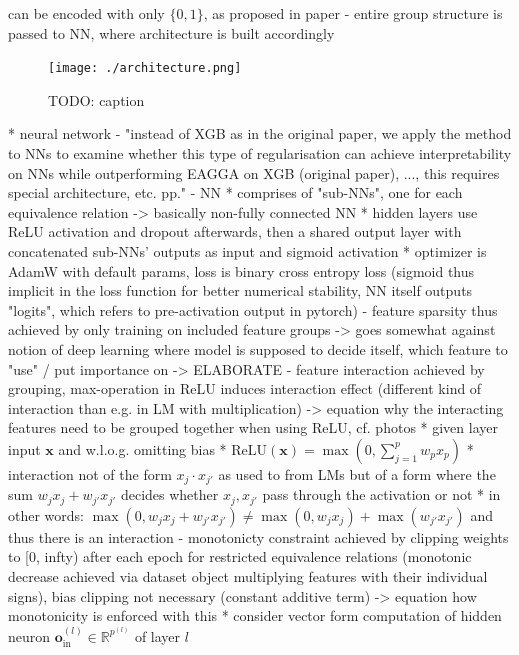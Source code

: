 \documentclass[twoside,11pt]{article}
\begin{document}
      can be encoded with only $\{0,1\}$, as proposed in paper
    - entire group structure is passed to NN, where architecture is built accordingly
\begin{figure}
  \centering
  \texttt{[image: ./architecture.png]}  %
  \caption{TODO: caption}
  \label{fig-nn-architecture}
\end{figure}
  * neural network
    - "instead of XGB as in the original paper, we apply the method to NNs to examine whether this type of regularisation can achieve interpretability on NNs while
      outperforming EAGGA on XGB (original paper), ..., this requires special architecture, etc. pp."
    - NN
      * comprises of "sub-NNs", one for each equivalence relation -> basically non-fully connected NN
      * hidden layers use ReLU activation and dropout afterwards, then a shared output layer with concatenated sub-NNs' outputs as input and sigmoid activation
      * optimizer is AdamW with default params, loss is binary cross entropy loss (sigmoid thus implicit in the loss function for better numerical stability,
        NN itself outputs "logits", which refers to pre-activation output in pytorch)
    - feature sparsity thus achieved by only training on included feature groups -> goes somewhat against notion of deep learning where model is supposed to decide itself,
      which feature to "use" / put importance on -> ELABORATE
    - feature interaction achieved by grouping, max-operation in ReLU induces interaction effect (different kind of interaction than e.g. in LM with multiplication)
      -> equation why the interacting features need to be grouped together when using ReLU, cf. photos
      * given layer input $\boldsymbol{x}$ and w.l.o.g. omitting bias
      * $\text{ReLU}(\boldsymbol{x})=\max(0,\sum_{j=1}^p w_p x_p)$
      * interaction not of the form $x_j \cdot x_{j'}$ as used to from LMs but of a form where the sum $w_j x_j+w_{j'} x_{j'}$ decides whether $x_j,x_{j'}$
        pass through the activation or not
      * in other words: $\max(0,w_j x_j + w_{j'} x_{j'})\neq\max(0,w_j x_j)+\max(w_{j'} x_{j'})$ and thus there is an interaction
    - monotonicty constraint achieved by clipping weights to [0, infty) after each epoch for restricted equivalence relations (monotonic decrease achieved
      via dataset object multiplying features with their individual signs), bias clipping not necessary (constant additive term)
      -> equation how monotonicity is enforced with this
      * consider vector form computation of hidden neuron $\boldsymbol{o}_{\text{in}}^{(l)}\in\mathbb{R}^{p^{(l)}}$ of layer $l$
\end{document}
